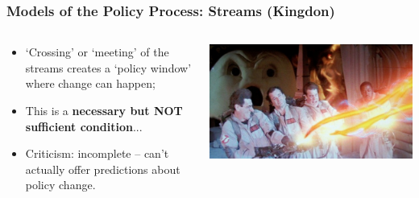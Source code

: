 \documentclass[aspectratio=169]{beamer}
\theoremstyle{principle}
\begin{document}
\begin{frame}
\frametitle{Models of the Policy Process: Streams (Kingdon)}
\begin{columns}
\begin{column}{0.5\textwidth}

\begin{itemize}
\item `Crossing' or `meeting' of the streams creates a `policy window' where change can happen;
\bigskip
\item This is a \textbf{necessary but NOT sufficient condition}...
\bigskip
\item Criticism: incomplete -- can't actually offer predictions about policy change.
\end{itemize}
\end{column}
\begin{column}{0.5\textwidth}

    \begin{center}
     \includegraphics[scale=0.3]{streams2.jpeg}
     \end{center}
\end{column}
\end{columns}

\end{frame}
\end{document}
